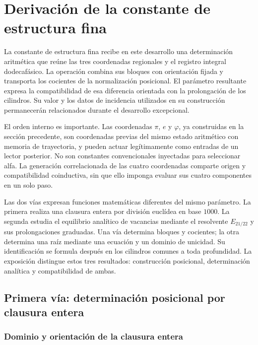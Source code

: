 \section{Derivación de la constante de estructura fina}
\label{sec:alpha}

La constante de estructura fina recibe en este desarrollo una determinación
aritmética que reúne las tres coordenadas regionales y el registro integral
dodecafásico. La operación combina sus bloques con orientación fijada y
transporta los cocientes de la normalización posicional. El parámetro
resultante expresa la compatibilidad de esa diferencia orientada con
la prolongación de los cilindros. Su valor y los datos de incidencia
utilizados en su construcción permanecerán relacionados durante el
desarrollo excepcional.

El orden interno es importante. Las coordenadas \(\pi\),
\(e\) y \(\varphi\), ya construidas en la sección precedente, son coordenadas
previas del mismo estado aritmético con memoria de trayectoria, y pueden actuar legítimamente como
entradas de un lector posterior. No son constantes convencionales
inyectadas para seleccionar alfa. La generación correlacionada de las cuatro coordenadas comparte origen y
compatibilidad coinductiva, sin que ello imponga evaluar sus cuatro
componentes en un solo paso.

Las dos vías expresan funciones matemáticas diferentes del mismo parámetro.
La primera realiza una clausura entera por división euclídea en base
\(1000\). La segunda estudia el equilibrio analítico de vacancias mediante
el resolvente \(E_{21/22}\) y sus prolongaciones graduadas. Una vía
determina bloques y cocientes; la otra determina una raíz mediante una
ecuación y un dominio de unicidad. Su identificación se formula después
en los cilindros comunes a toda profundidad. La exposición distingue
estos tres resultados: construcción posicional, determinación analítica
y compatibilidad de ambas.

\subsection{Primera vía: determinación posicional por clausura entera}
\subsubsection{Dominio y orientación de la clausura entera}
\label{subsec:alpha-dominio}

